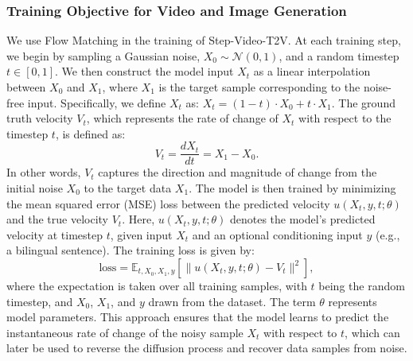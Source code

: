 \subsubsection{Training Objective for Video and Image Generation}
We use Flow Matching in the training of Step-Video-T2V. At each training step, we begin by sampling a Gaussian noise, $X_0 \sim \mathcal{N}(0,1)$, and a random timestep $t \in [0,1]$. We then construct the model input $X_t$ as a linear interpolation between $X_0$ and $X_1$, where $X_1$ is the target sample corresponding to the noise-free input. Specifically, we define $X_t$ as:
$X_t = (1 - t) \cdot X_0 + t \cdot X_1$. The ground truth velocity $V_t$, which represents the rate of change of $X_t$ with respect to the timestep $t$, is defined as:
\begin{equation}
    V_t = \frac{dX_t}{dt} = X_1 - X_0 .
\end{equation}
In other words, $V_t$ captures the direction and magnitude of change from the initial noise $X_0$ to the target data $X_1$.
The model is then trained by minimizing the mean squared error (MSE) loss between the predicted velocity $u(X_t, y, t; \theta)$ and the true velocity $V_t$. Here, $u(X_t, y, t; \theta)$ denotes the model's predicted velocity at timestep $t$, given input $X_t$ and an optional conditioning input $y$ (e.g., a bilingual sentence). The training loss is given by:
\begin{equation}
    \text{loss} = \mathbb{E}_{t, X_0, X_1, y} \left[ \| u(X_t, y, t; \theta) - V_t \|^2 \right],
\end{equation}
where the expectation is taken over all training samples, with $t$ being the random timestep, and $X_0$, $X_1$, and $y$ drawn from the dataset. The term $\theta$ represents model parameters.
This approach ensures that the model learns to predict the instantaneous rate of change of the noisy sample $X_t$ with respect to $t$, which can later be used to reverse the diffusion process and recover data samples from noise.

